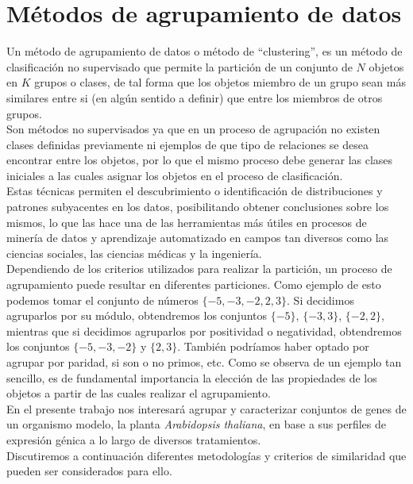 \chapter{Métodos de agrupamiento de datos}
Un método de agrupamiento de datos o método de ``clustering'', es un método de clasificación no supervisado que permite la partición de un conjunto de $N$ objetos en $K$ grupos o clases, de tal forma que los objetos miembro de un grupo sean más similares entre si (en algún sentido a definir) que entre los miembros de otros grupos.\\
Son métodos no supervisados ya que en un proceso de agrupación no existen clases definidas previamente ni ejemplos de que tipo de relaciones se desea encontrar entre los objetos, por lo que el mismo proceso debe generar las clases iniciales a las cuales asignar los objetos en el proceso de clasificación.\\
Estas técnicas permiten el descubrimiento o identificación de distribuciones y patrones subyacentes en los datos, posibilitando obtener conclusiones sobre los mismos, lo que las hace una de las herramientas más útiles en procesos de minería de datos y aprendizaje automatizado en campos tan diversos como las ciencias sociales, las ciencias médicas y la ingeniería.\\
Dependiendo de los criterios utilizados para realizar la partición, un proceso de agrupamiento puede resultar en diferentes particiones. Como ejemplo de esto podemos tomar el conjunto de números $\{-5, -3, -2, 2, 3\}$. Si decidimos agruparlos por su módulo, obtendremos los conjuntos $\{-5\}$, $\{-3, 3\}$, $\{-2, 2\}$, mientras que si decidimos agruparlos por positividad o negatividad, obtendremos los conjuntos $\{-5, -3, -2\}$ y $\{2, 3\}$. También podríamos haber optado por agrupar por paridad, si son o no primos, etc. Como se observa de un ejemplo tan sencillo, es de fundamental importancia la elección de las propiedades de los objetos a partir de las cuales realizar el agrupamiento.\\
En el presente trabajo nos interesará agrupar y caracterizar conjuntos de genes de un organismo modelo, la planta \textit{Arabidopsis thaliana}, en base a sus perfiles de expresión génica a lo largo de diversos tratamientos.\cite{Gan2007, Halkidi2001, Domany1999}\\
Discutiremos a continuación diferentes metodologías y criterios de similaridad que pueden ser considerados para ello.
